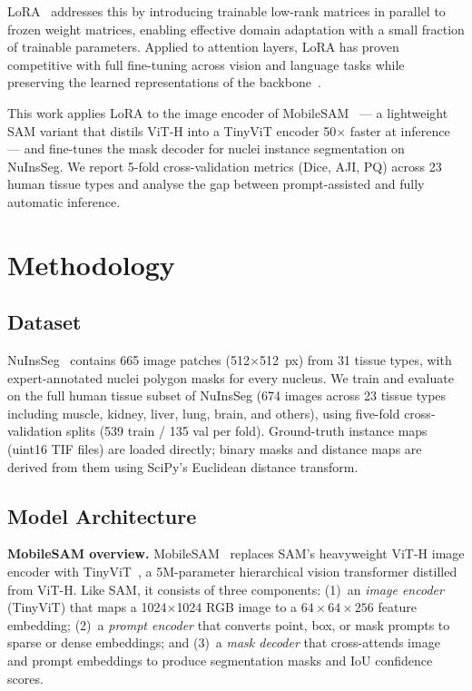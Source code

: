 \documentclass[10pt,twocolumn]{article}
\begin{document}
LoRA~\cite{hu2021lora} addresses this by introducing trainable
low-rank matrices in parallel to frozen weight matrices, enabling
effective domain adaptation with a small fraction of trainable
parameters. Applied to attention layers, LoRA has proven
competitive with full fine-tuning across vision and language
tasks while preserving the learned representations of the
backbone~\cite{hu2021lora}.

This work applies LoRA to the image encoder of
MobileSAM~\cite{zhang2023mobilesam} --- a lightweight SAM
variant that distils ViT-H into a TinyViT encoder 50$\times$
faster at inference --- and fine-tunes the mask decoder for
nuclei instance segmentation on NuInsSeg. We report 5-fold
cross-validation metrics (Dice, AJI, PQ) across 23 human
tissue types and analyse the gap between prompt-assisted and
fully automatic inference.

\section{Methodology}

\subsection{Dataset}

NuInsSeg~\cite{mahbod2024nuinsseg} contains 665 image patches
(512$\times$512~px) from 31 tissue types, with expert-annotated
nuclei polygon masks for every nucleus. We train and evaluate on
the full human tissue subset of NuInsSeg (674 images across 23
tissue types including muscle, kidney, liver, lung, brain, and
others), using five-fold cross-validation splits (539 train /
135 val per fold). Ground-truth instance maps (uint16 TIF files)
are loaded directly; binary masks and distance maps are derived
from them using SciPy's Euclidean distance transform.

\subsection{Model Architecture}

\textbf{MobileSAM overview.}
MobileSAM~\cite{zhang2023mobilesam} replaces SAM's heavyweight
ViT-H image encoder with TinyViT~\cite{wu2022tinyvit}, a 5M-parameter
hierarchical vision transformer distilled from ViT-H. Like SAM,
it consists of three components: (1)~an \emph{image encoder}
(TinyViT) that maps a 1024$\times$1024 RGB image to a
$64\times64\times256$ feature embedding; (2)~a \emph{prompt
encoder} that converts point, box, or mask prompts to sparse
or dense embeddings; and (3)~a \emph{mask decoder} that cross-attends
image and prompt embeddings to produce segmentation masks and
IoU confidence scores.
\end{document}
